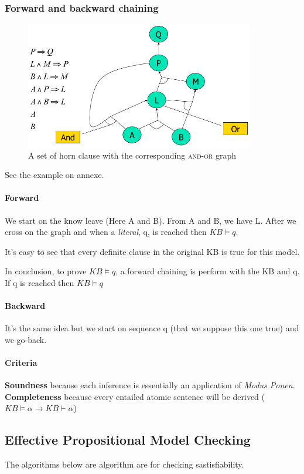 \subsubsection{Forward and backward chaining}

\begin{figure}[h]
    \centering
    \includegraphics[width=10cm]{andor.png}
    \caption{A set of horn clause with the corresponding \textsc{and-or} graph}
\end{figure}


See the example on annexe.

\paragraph{Forward}
We start on the know leave (Here A and B). From A and B, we have L. After we cross on the graph 
and when a \textit{literal}, q,  is reached then $KB \models q$.

It's easy to see that every definite clause in the original KB is true
for this model.

In conclusion, to prove $KB \models q$, a forward chaining is perform
with the KB and q. If q is reached then $KB \models q$

\paragraph{Backward}
It's the same idea but we start on sequence q (that we suppose this one true) and
we go-back.

\paragraph{Criteria} \textbf{Soundness} because each inference is essentially
an application of \textit{Modus Ponen}. \textbf{Completeness} because every entailed
atomic sentence will be derived ($KB \models \alpha \to KB \vdash \alpha$)


\subsection{Effective Propositional Model Checking}
The algorithms below are algorithm are for checking sastisfiability. 

